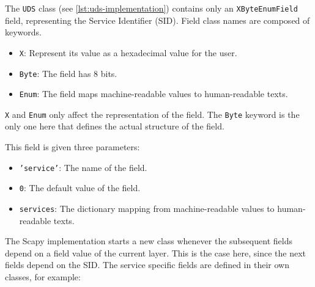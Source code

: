 
The \texttt{UDS} class (see \autoref{lst:uds-implementation}) contains only an \texttt{XByteEnumField} field, representing the Service Identifier (SID). Field class names are composed of keywords.
\begin{samepage}
\begin{itemize}
    \item \texttt{X}: Represent its value as a hexadecimal value for the user.
    \item \texttt{Byte}: The field has 8 bits.
    \item \texttt{Enum}: The field maps machine-readable values to human-readable texts.
\end{itemize}
\end{samepage}

\texttt{X} and \texttt{Enum} only affect the representation of the field. The \texttt{Byte} keyword is the only one here that defines the actual structure of the field.

This field is given three parameters:

\begin{itemize}
    \item \texttt{'service'}: The name of the field.
    \item \texttt{0}: The default value of the field.
    \item \texttt{services}: The dictionary mapping from machine-readable values to human-readable texts.
\end{itemize}

The Scapy implementation starts a new class whenever the subsequent fields depend on a field value of the current layer. This is the case here, since the next fields depend on the SID. The service specific fields are defined in their own classes, for example:

